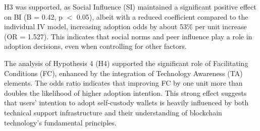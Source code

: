 \documentclass[twocolumn]{article}
\begin{document}
H3 was supported, as Social Influence (SI) maintained a significant positive effect on BI (B = 0.42, p $<$ 0.05), albeit with a reduced coefficient compared to the individual IV model, increasing adoption odds by about 53\% per unit increase (OR = 1.527). This indicates that social norms and peer influence play a role in adoption decisions, even when controlling for other factors.

The analysis of Hypothesis 4 (H4) supported the significant role of Facilitating Conditions (FC), enhanced by the integration of Technology Awareness (TA) elements. The odds ratio indicates that improving FC by one unit more than doubles the likelihood of higher adoption intention. This strong effect suggests that users' intention to adopt self-custody wallets is heavily influenced by both technical support infrastructure and their understanding of blockchain technology's fundamental principles. 
\end{document}
